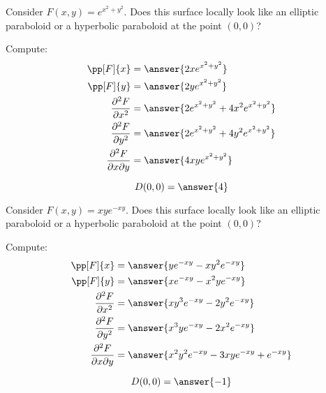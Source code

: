 \documentclass{ximera}
\begin{document}
\begin{question}
  Consider $F(x,y) = e^{x^2+y^2}$. Does this surface locally look like
  an elliptic paraboloid or a hyperbolic paraboloid at the point
  $(0,0)$?
  \begin{prompt}
    Compute:
    \begin{align*}
      \pp[F]{x} &= \answer{2x e^{x^2+y^2}}\\
      \pp[F]{y} &= \answer{2y e^{x^2+y^2}}\\
      \frac{\partial^2F}{\partial x^2} &= \answer{2 e^{x^2+y^2}+4x^2 e^{x^2+y^2}}\\
      \frac{\partial^2F}{\partial y^2} &= \answer{2 e^{x^2+y^2}+4y^2 e^{x^2+y^2}}\\
      \frac{\partial^2F}{\partial x\partial y} &= \answer{4 x y e^{x^2+y^2}}\\
    \end{align*}
    \begin{question}
      \[
      D(0,0) = \answer{4}
      \]
      \begin{question}
        \begin{multipleChoice}
        \end{multipleChoice}
      \end{question}
    \end{question}
  \end{prompt}
\end{question}

\begin{question}
  Consider $F(x,y) = x y e^{-xy}$. Does this surface locally look like
  an elliptic paraboloid or a hyperbolic paraboloid at the point
  $(0,0)$?
  \begin{prompt}
    Compute:
    \begin{align*}
      \pp[F]{x} &= \answer{y e^{-x y}-xy^2e^{-x y}}\\
      \pp[F]{y} &= \answer{x e^{-x y}-x^2ye^{-x y}}\\
      \frac{\partial^2F}{\partial x^2} &= \answer{xy^3e^{-xy}-2y^2e^{-xy}}\\
      \frac{\partial^2F}{\partial y^2} &= \answer{x^3ye^{-xy}-2x^2e^{-xy}}\\
      \frac{\partial^2F}{\partial x\partial y} &= \answer{x^2 y^2 e^{-x y}-3 x y e^{-x y}+e^{-x y}}\\
    \end{align*}
    \begin{question}
      \[
      D(0,0) = \answer{-1}
      \]
      \begin{question}
        \begin{multipleChoice}
        \end{multipleChoice}
      \end{question}
    \end{question}
  \end{prompt}
\end{question}
\end{document}
